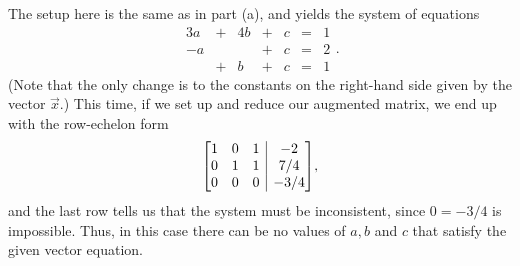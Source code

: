 \documentclass[letterpaper,12pt]{article}
\makeatletter
\newenvironment{amatrix}[1]{%
  \left[\begin{array}{@{}*{#1}{c}|c@{}}
}{%
  \end{array}\right]
}
\makeatother
\begin{document}
\begin{enumerate}
\begin{enumerate}
 \bigskip
 
 The setup here is the same as in part (a), and yields the system of equations
  \[
 \begin{array}{ccccccc}
 3a&+&4b&+&c&=&1\\
 -a& & &+&c&=&2\\
   &+&b&+&c&=&1
 \end{array}.
 \]
 (Note that the only change is to the constants on the right-hand side given by the vector $\vec{x}$.) This time, if we set up and reduce our augmented matrix, we end up with the row-echelon form
 \[
 \begin{amatrix}{3}
 1&0&1&-2\\
 0&1&1&7/4\\
 0&0&0&-3/4
 \end{amatrix},
 \]
 and the last row tells us that the system must be inconsistent, since $0=-3/4$ is impossible. Thus, in this case there can be no values of $a,b$ and $c$ that satisfy the given vector equation.
\end{enumerate}
 \end{enumerate}
\end{document}

